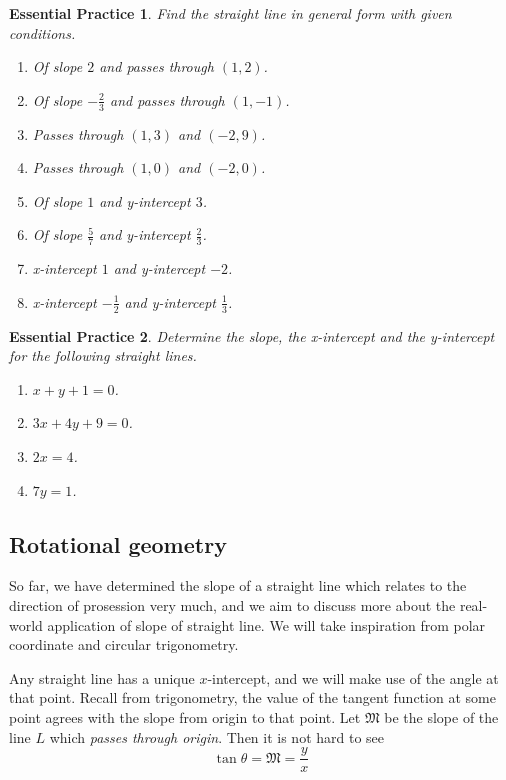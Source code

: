 \documentclass[12pt]{article}
\newtheorem{exercise}{Essential Practice}[subsection]
\begin{document}
    \begin{exercise}
        Find the straight line in general form with given conditions. \begin{enumerate}
            \item Of slope $2$ and passes through $(1,2)$.
            \item Of slope $-\frac{2}{3}$ and passes through $(1,-1)$.
            \item Passes through $(1,3)$ and $(-2,9)$.
            \item Passes through $(1,0)$ and $(-2,0)$.
            \item Of slope $1$ and y-intercept $3$.
            \item Of slope $\frac{5}{7}$ and y-intercept $\frac{2}{3}$.
            \item x-intercept $1$ and y-intercept $-2$.
            \item x-intercept $-\frac{1}{2}$ and y-intercept $\frac{1}{3}$.
        \end{enumerate}
    \end{exercise}

    \begin{exercise}
        Determine the slope, the x-intercept and the y-intercept for the following straight lines.\begin{enumerate}
            \item $x+y+1=0$.
            \item $3x+4y+9=0$.
            \item $2x=4$.
            \item $7y=1$.
        \end{enumerate}
    \end{exercise}

    \pagebreak

    \subsection{Rotational geometry}

    So far, we have determined the slope of a straight line which relates to the direction of prosession very much, and we aim to discuss more about the real-world application of slope of straight line. We will take inspiration from polar coordinate and circular trigonometry.

    Any straight line has a unique $x$-intercept, and we will make use of the angle at that point. Recall from trigonometry, the value of the tangent function at some point agrees with the slope from origin to that point. Let $\mathfrak{M}$ be the slope of the line $L$ which \textit{passes through origin}. Then it is not hard to see \[\tan{\theta}=\mathfrak{M}=\frac{y}{x}\]
\end{document}
